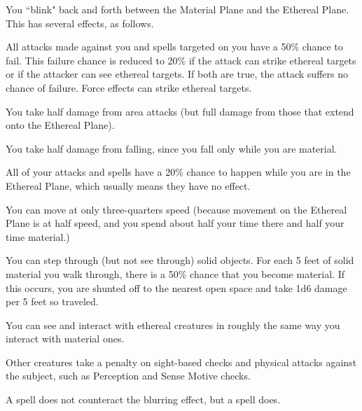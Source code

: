 \spelldur{\durshort \dismissable}
\begin{spelleffect}
    You ``blink" back and forth between the Material Plane and the Ethereal Plane. This has several effects, as follows.
    \begin{itemize*}
        \item All attacks made against you and spells targeted on you have a 50\% chance to fail. This failure chance is reduced to 20\% if the attack can strike ethereal targets or if the attacker can see ethereal targets. If both are true, the attack suffers no chance of failure. Force effects can strike ethereal targets.
        \item You take half damage from area attacks (but full damage from those that extend onto the Ethereal Plane).
        \item You take half damage from falling, since you fall only while you are material.
        \item All of your attacks and spells have a 20\% chance to happen while you are in the Ethereal Plane, which usually means they have no effect.
        \item You can move at only three-quarters speed (because movement on the Ethereal Plane is at half speed, and you spend about half your time there and half your time material.)
        \item You can step through (but not see through) solid objects. For each 5 feet of solid material you walk through, there is a 50\% chance that you become material. If this occurs, you are shunted off to the nearest open space and take 1d6 damage per 5 feet so traveled. 
        \item You can see and interact with ethereal creatures in roughly the same way you interact with material ones.
    \end{itemize*}
\end{spelleffect}

\spelldur{\durshort \dismissable}
\begin{spelleffect}
    Other creatures take a  penalty on sight-based checks and physical attacks against the subject, such as Perception and Sense Motive checks.
\end{spelleffect}
\begin{spellnotes}
    A  spell does not counteract the blurring effect, but a  spell does.
\end{spellnotes}


